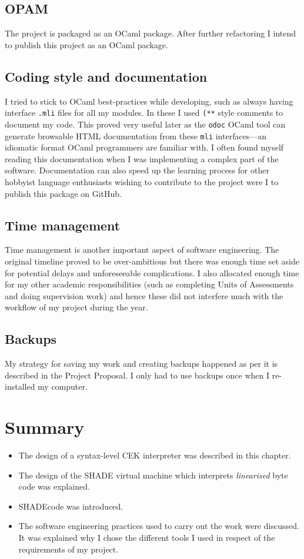 \documentclass[class=article, crop=false]{standalone}
\begin{document}
\subsection{OPAM}

The project is packaged as an OCaml package. After further refactoring I
intend to publish this project as an OCaml package.

\subsection{Coding style and documentation}

I tried to stick to OCaml best-practices while developing, such as always
having interface \verb|.mli| files for all my modules.
In these I used \verb|(**| style comments to document my code. This proved very
useful later as the \verb|odoc| OCaml tool can generate browsable HTML
documentation from these \verb|mli| interfaces---an idiomatic format OCaml
programmers are familiar with.
I often found myself reading this documentation when I was implementing a complex
part of the software. Documentation can also speed up the learning
process for other hobbyist language enthusiasts wishing to contribute to the
project were I to publish this package on GitHub.

\subsection{Time management}

Time management is another important aspect of software engineering. The original
timeline proved to be over-ambitious but there was enough time set aside for
potential delays and unforeseeable complications. I also allocated enough time
for my other academic responsibilities (such as completing Units of Assessments
and doing supervision work) and hence these did not interfere much with the
workflow of my project during the year.

\subsection{Backups}

My strategy for saving my work and creating backups happened as per it is
described in the Project Proposal. I only had to use backups once when I
re-installed my computer.

\section{Summary}
\begin{itemize}
\item The design of a syntax-level CEK interpreter was described in this chapter.
\item The design of the SHADE virtual machine which interprets \emph{linearised}
byte code was explained.
\item SHADEcode was introduced.
\item The software engineering practices used to carry out the work were discussed.
It was explained why I chose the different tools I used in respect of the
requirements of my project.
\end{itemize}
\end{document}
